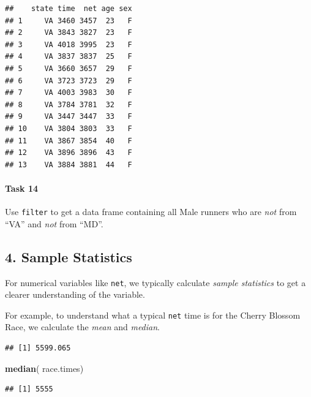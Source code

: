 \documentclass[
]{article}
\newenvironment{Shaded}{\begin{snugshade}}{\end{snugshade}}
\newcommand{\FunctionTok}[1]{\textcolor[rgb]{0.13,0.29,0.53}{\textbf{#1}}}
\newcommand{\NormalTok}[1]{#1}
\newcommand{\OtherTok}[1]{\textcolor[rgb]{0.56,0.35,0.01}{#1}}
\newcommand{\SpecialCharTok}[1]{\textcolor[rgb]{0.81,0.36,0.00}{\textbf{#1}}}
\begin{document}
\begin{verbatim}
##    state time  net age sex
## 1     VA 3460 3457  23   F
## 2     VA 3843 3827  23   F
## 3     VA 4018 3995  23   F
## 4     VA 3837 3837  25   F
## 5     VA 3660 3657  29   F
## 6     VA 3723 3723  29   F
## 7     VA 4003 3983  30   F
## 8     VA 3784 3781  32   F
## 9     VA 3447 3447  33   F
## 10    VA 3804 3803  33   F
## 11    VA 3867 3854  40   F
## 12    VA 3896 3896  43   F
## 13    VA 3884 3881  44   F
\end{verbatim}

\paragraph{Task 14}\label{task-14}

Use \texttt{filter} to get a data frame containing all Male runners who
are \emph{not} from ``VA'' and \emph{not} from ``MD''.

\subsection{4. Sample Statistics}\label{sample-statistics}

For numerical variables like \texttt{net}, we typically calculate
\emph{sample statistics} to get a clearer understanding of the variable.

For example, to understand what a typical \texttt{net} time is for the
Cherry Blossom Race, we calculate the \emph{mean} and \emph{median}.

\begin{Shaded}
\end{Shaded}

\begin{verbatim}
## [1] 5599.065
\end{verbatim}

\begin{Shaded}
\begin{Highlighting}[]
\FunctionTok{median}\NormalTok{( race.times)}
\end{Highlighting}
\end{Shaded}

\begin{verbatim}
## [1] 5555
\end{verbatim}
\end{document}
